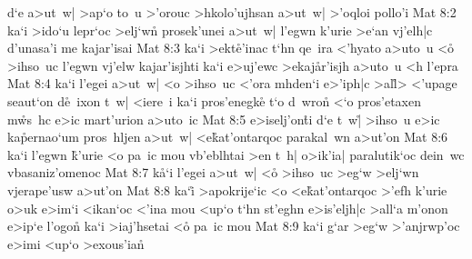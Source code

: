 d`e
a>ut~w|
>ap`o
to~u
>'orouc
>hkolo'ujhsan
a>ut~w|
>'oqloi
pollo'i\bibvsend
\vs Mat 8:2
ka`i
>ido`u
lepr`oc
>elj`w\r{n}
prosek'unei
a>ut~w|
l'egwn
k'urie
>e`an
vj'elh|c
d'unasa'i
me
kajar'isai\bibvsend
\vs Mat 8:3
ka`i
>ekt\r{e}'inac
t`hn
qe~ira
<'hyato
a>uto~u
<o\r{}
>ihso~uc
l'egwn
vj'elw
kajar'isjhti
ka`i
e>uj'ewc
>ekaj\r{a}r'isjh
a>uto~u
<h
l'epra\bibvsend
\vs Mat 8:4
ka`i
l'egei
a>ut~w|
<o
>ihso~uc
<'ora
mhden`i
e>'iph|c
>al\r{l}>
<'upage
seaut`on
d\r{e}~ixon
t~w|
<iere~i
ka`i
pros'enegk\r{e}
t`o
d~wro\r{n}
<`o
pros'etaxen
m\r{w}s~hc
e>ic
mart'urion
a>uto~ic\bibvsend
\vs Mat 8:5
e>iselj'on\r{t}i
d`e
t~w|\r{}
>ihso~u
e>ic
ka\r{p}ernao`um
pros~hljen
a>ut~w|
<e\r{k}at'ontarqoc
parakal~wn
a>ut'on\bibvsend
\vs Mat 8:6
ka`i
l'egwn
\r{k}'urie
<o
pa~ic
mou
vb'eblhtai
>en
t~h|
o>ik'ia|
paralutik`oc
dein~wc
vbasaniz'omenoc\bibvsend
\vs Mat 8:7
k\r{a}`i
l'egei
a>ut~w|
<o\r{}
>ihso~uc
>eg`w
>elj`wn
vjerape'usw
a>ut'on\bibvsend
\vs Mat 8:8
ka`i\r{}
>apokrije`ic
<o
<e\r{k}at'ontarqoc
>'efh
k'urie
o>uk
e>im`i
<ikan`oc
<'ina
mou
<up`o
t`hn
st'eghn
e>is'eljh|c
>all`a
m'onon
e>ip`e
l'ogo\r{n}
ka`i
>iaj'hsetai
<o\r{}
pa~ic
mou\bibvsend
\vs Mat 8:9
ka`i
g`ar
>eg`w
>'anjrwp'oc
e>imi
<up`o
>exous'ia\r{n}
